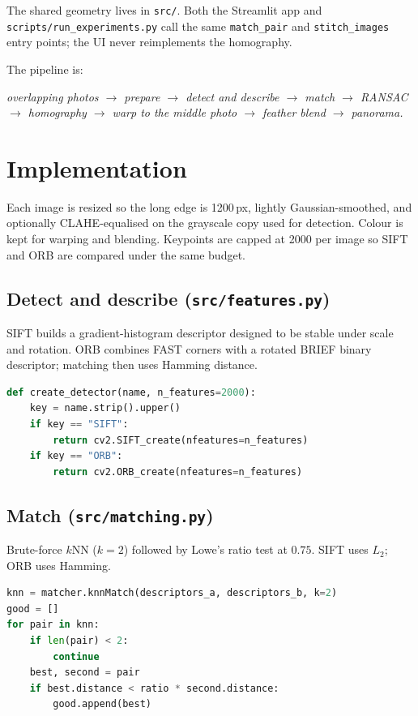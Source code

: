 \documentclass[11pt,a4paper]{article}
\begin{document}
The shared geometry lives in \texttt{src/}. Both the Streamlit app and
\texttt{scripts/run\_experiments.py} call the same \texttt{match\_pair} and
\texttt{stitch\_images} entry points; the UI never reimplements the homography.

The pipeline is:

\textit{overlapping photos $\rightarrow$ prepare $\rightarrow$ detect and describe
$\rightarrow$ match $\rightarrow$ RANSAC $\rightarrow$ homography $\rightarrow$ warp
to the middle photo $\rightarrow$ feather blend $\rightarrow$ panorama.}

\section{Implementation}

Each image is resized so the long edge is 1200\,px, lightly Gaussian-smoothed,
and optionally CLAHE-equalised on the grayscale copy used for detection.
Colour is kept for warping and blending. Keypoints are capped at 2000 per
image so SIFT and ORB are compared under the same budget.

\subsection{Detect and describe (\texttt{src/features.py})}

SIFT builds a gradient-histogram descriptor designed to be stable under scale
and rotation. ORB combines FAST corners with a rotated BRIEF binary
descriptor; matching then uses Hamming distance.

\begin{lstlisting}[language=Python,caption={Detector factory.}]
def create_detector(name, n_features=2000):
    key = name.strip().upper()
    if key == "SIFT":
        return cv2.SIFT_create(nfeatures=n_features)
    if key == "ORB":
        return cv2.ORB_create(nfeatures=n_features)
\end{lstlisting}

\subsection{Match (\texttt{src/matching.py})}

Brute-force $k$NN ($k{=}2$) followed by Lowe's ratio test at $0.75$. SIFT uses
$L_2$; ORB uses Hamming.

\begin{lstlisting}[language=Python,caption={Lowe ratio test on $k$NN pairs.}]
knn = matcher.knnMatch(descriptors_a, descriptors_b, k=2)
good = []
for pair in knn:
    if len(pair) < 2:
        continue
    best, second = pair
    if best.distance < ratio * second.distance:
        good.append(best)
\end{lstlisting}
\end{document}

